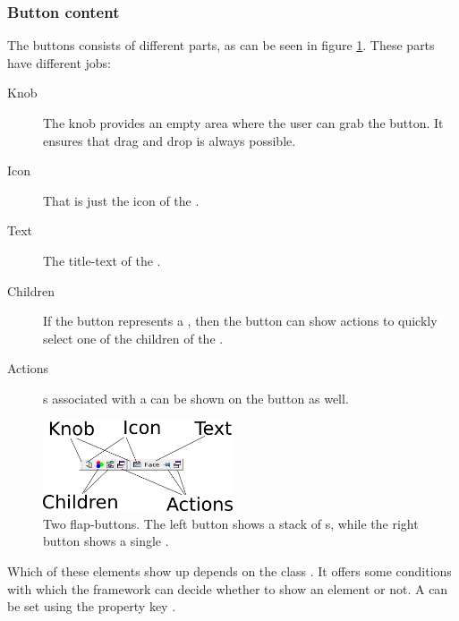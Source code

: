 \subsubsection{Button content}
The buttons consists of different parts, as can be seen in figure \ref{fig:flap}. These parts have different jobs:
\begin{description}
 \item[Knob] The knob provides an empty area where the user can grab the button. It ensures that drag and drop is always possible.
 \item[Icon] That is just the icon of the .
 \item[Text] The title-text of the .
 \item[Children] If the button represents a , then the button can show actions to quickly select one of the children of the .
 \item[Actions] s associated with a  can be shown on the button as well.
\end{description}

\begin{figure}[h!]
  \centering
    \includegraphics[width=0.5\textwidth]{stations/flap}
  \caption{Two flap-buttons. The left button shows a stack of s, while the right button shows a single .}
  \label{fig:flap}
\end{figure}

Which of these elements show up depends on the class . It offers some conditions with which the framework can decide whether to show an element or not. A  can be set using the property key .



